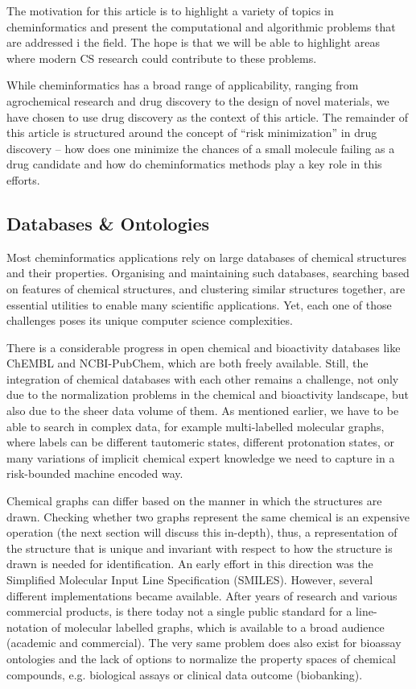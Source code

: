 \documentclass{sig-alternate}
\begin{document}
The motivation for this article is to highlight a variety of topics in
cheminformatics and present the computational and algorithmic problems that are
addressed i the field. The hope is that we will be able to highlight areas where modern CS
research could contribute to these problems. 

While cheminformatics has a broad range of applicability, ranging from
agrochemical research and drug discovery to the design of novel materials, we
have chosen to use drug discovery as the context of this article. The remainder
of this article is structured around the concept of ``risk minimization'' in
drug discovery -- how does one minimize the chances of a small molecule failing
as a drug candidate and how do cheminformatics methods play a key role in this
efforts.

\subsection{Databases \& Ontologies}

Most cheminformatics applications rely on large databases of chemical structures
and their properties. Organising and maintaining such databases, searching based
on features of chemical structures, and clustering similar structures together,
are essential utilities to enable many scientific applications. Yet, each one of
those challenges poses its unique computer science complexities.

There is a considerable progress in open chemical and bioactivity databases like
ChEMBL and NCBI-PubChem, which are both freely available. Still, the integration
of chemical databases with each other remains a challenge, not only due to the
normalization problems in the chemical and bioactivity landscape, but also due
to the sheer data volume of them. As mentioned earlier, we have to be able to
search in complex data, for example multi-labelled molecular graphs, where
labels can be different tautomeric states, different protonation states, or many
variations of implicit chemical expert knowledge we need to capture in a
risk-bounded machine encoded way.

Chemical graphs can differ based on the manner in which the structures are
drawn. Checking whether two graphs represent the same chemical is an expensive
operation (the next section will discuss this in-depth), thus, a representation
of the structure that is unique and invariant with respect to how the structure
is drawn is needed for identification. An early effort in this direction was the
Simplified Molecular Input Line Specification (SMILES). However, several
different implementations became available. After years of research and various
commercial products, is there today not a single public standard for a
line-notation of molecular labelled graphs, which is available to a broad
audience (academic and commercial). The very same problem does also exist for
bioassay ontologies and the lack of options to normalize the property spaces of
chemical compounds, e.g. biological assays or clinical data outcome
(biobanking).
   
\end{document}
